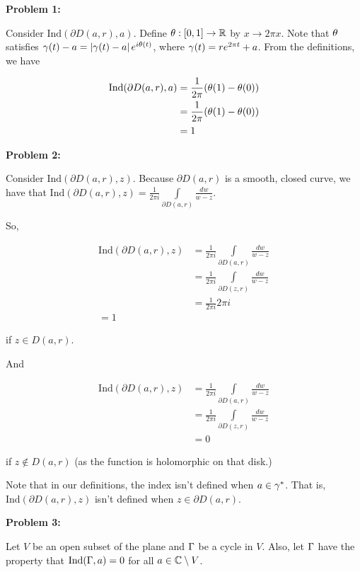 \documentclass[a4paper,12pt]{article}
\begin{document}
{\bf Problem 1:}

Consider $\text{Ind}(\partial D(a,r),a)$. Define $\theta: [0,1] \to \mathbb{R}$ by $x \to 2\pi x$. Note that $\theta$ satisfies $\gamma(t) - a = \left\lvert \gamma(t) - a \right\rvert e^{i \theta (t)}$, where $\gamma(t) = re^{2\pi t}+a$. From the definitions, we have

\begin{align*}
\text{Ind}(\partial D(a,r),a) &= \frac{1}{2\pi} (\theta (1) - \theta(0))\\
&= \frac{1}{2\pi} (\theta (1) - \theta(0))\\
&= 1
\end{align*}

\shunt

{\bf Problem 2:}

Consider $\text{Ind}(\partial D(a,r),z)$. Because $\partial D(a,r)$ is a smooth, closed curve, we have that $\text{Ind}(\partial D(a,r),z) = \frac{1}{2\pi i} \int\limits_{\partial D(a,r)} \frac{dw}{w-z}$.

So,

\begin{align*}
\text{Ind}(\partial D(a,r),z) &= \frac{1}{2\pi i} \int\limits_{\partial D(a,r)} \frac{dw}{w-z}\\
&= \frac{1}{2\pi i} \int\limits_{\partial D(z,r)} \frac{dw}{w-z}\\
&=\frac{1}{2\pi i} 2 \pi i\\
=1
\end{align*}

if $z \in D(a,r)$.

And

\begin{align*}
\text{Ind}(\partial D(a,r),z) &= \frac{1}{2\pi i} \int\limits_{\partial D(a,r)} \frac{dw}{w-z}\\
&= \frac{1}{2\pi i} \int\limits_{\partial D(z,r)} \frac{dw}{w-z}\\
&=0
\end{align*}

if $z \notin D(a,r)$ (as the function is holomorphic on that disk.)

Note that in our definitions, the index isn't defined when $a \in \gamma^*$. That is, $\text{Ind}(\partial D(a,r),z)$ isn't defined when $z \in \partial D(a,r)$.

\shunt

{\bf Problem 3:}

Let $V$ be an open subset of the plane and $\Gamma$ be a cycle in $V$. Also, let $\Gamma$ have the property that $\text{Ind}(\Gamma, a) =0$ for all $a \in \mathbb{C} \setminus V$.
\end{document}
